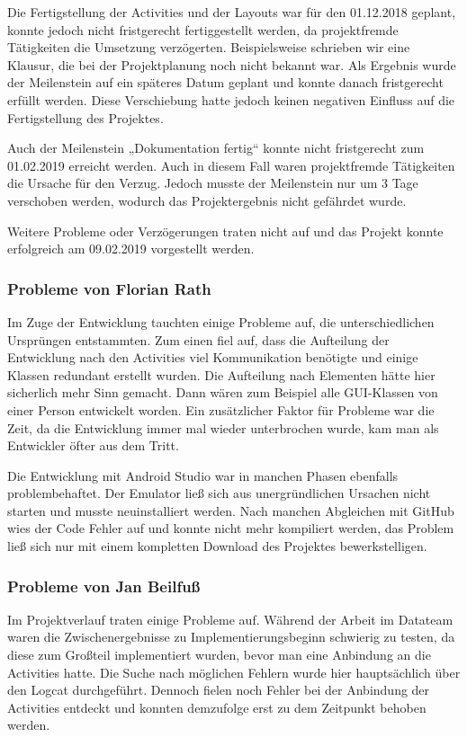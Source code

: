 Die Fertigstellung der Activities und der Layouts war für den 01.12.2018 geplant, konnte jedoch nicht fristgerecht fertiggestellt werden, da projektfremde Tätigkeiten die Umsetzung verzögerten. Beispielsweise schrieben wir eine Klausur, die bei der Projektplanung noch nicht bekannt war. Als Ergebnis wurde der Meilenstein auf ein späteres Datum geplant und konnte danach fristgerecht erfüllt werden. Diese Verschiebung hatte jedoch keinen negativen Einfluss auf die Fertigstellung des Projektes.

Auch der Meilenstein „Dokumentation fertig“ konnte nicht fristgerecht zum 01.02.2019 erreicht werden. Auch in diesem Fall waren projektfremde Tätigkeiten die Ursache für den Verzug. Jedoch musste der Meilenstein nur um 3 Tage verschoben werden, wodurch das Projektergebnis nicht gefährdet wurde.

Weitere Probleme oder Verzögerungen traten nicht auf und das Projekt konnte erfolgreich am 09.02.2019 vorgestellt werden.

\subsubsection{Probleme von Florian Rath}
Im Zuge der Entwicklung tauchten einige Probleme auf, die unterschiedlichen Ursprüngen entstammten. Zum einen fiel auf, dass die Aufteilung der Entwicklung nach den Activities viel Kommunikation benötigte und einige Klassen redundant erstellt wurden. Die Aufteilung nach Elementen hätte hier sicherlich mehr Sinn gemacht. Dann wären zum Beispiel alle GUI-Klassen von einer Person entwickelt worden. Ein zusätzlicher Faktor für Probleme war die Zeit, da die Entwicklung immer mal wieder unterbrochen wurde, kam man als Entwickler öfter aus dem Tritt.

Die Entwicklung mit Android Studio war in manchen Phasen ebenfalls problembehaftet. Der Emulator ließ sich aus unergründlichen Ursachen nicht starten und musste neuinstalliert werden. Nach manchen Abgleichen mit GitHub wies der Code Fehler auf und konnte nicht mehr kompiliert werden, das Problem ließ sich nur mit einem kompletten Download des Projektes bewerkstelligen.

\subsubsection{Probleme von Jan Beilfuß}
Im Projektverlauf traten einige Probleme auf. Während der Arbeit im Datateam waren die Zwischenergebnisse zu Implementierungsbeginn schwierig zu testen, da diese zum Großteil implementiert wurden, bevor man eine Anbindung an die Activities hatte. Die Suche nach möglichen Fehlern wurde hier hauptsächlich über den Logcat durchgeführt. Dennoch fielen noch Fehler bei der Anbindung der Activities entdeckt und konnten demzufolge erst zu dem Zeitpunkt behoben werden.

